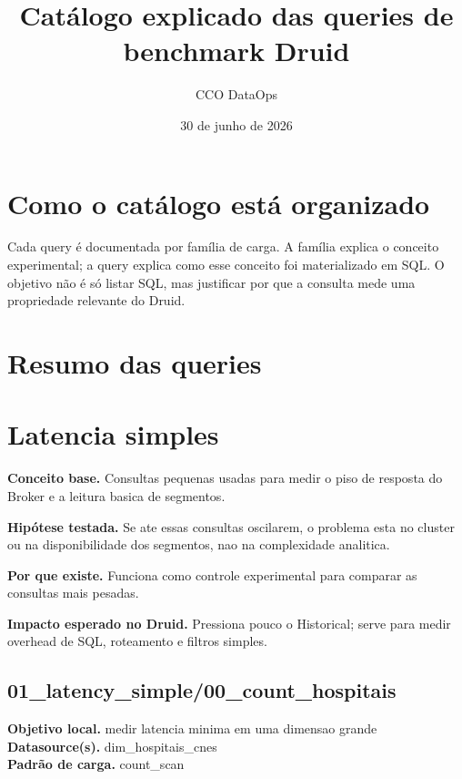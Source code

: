\documentclass[11pt,a4paper]{article}
\title{Catálogo explicado das queries de benchmark Druid}
\author{CCO DataOps}
\date{30 de junho de 2026}
\begin{document}
\maketitle


\section{Como o catálogo está organizado}

Cada query é documentada por família de carga. A família explica o conceito experimental; a query explica como esse conceito foi materializado em SQL. O objetivo não é só listar SQL, mas justificar por que a consulta mede uma propriedade relevante do Druid.

\section{Resumo das queries}



\clearpage

\section{Latencia simples}

\textbf{Conceito base.} Consultas pequenas usadas para medir o piso de resposta do Broker e a leitura basica de segmentos.

\textbf{Hipótese testada.} Se ate essas consultas oscilarem, o problema esta no cluster ou na disponibilidade dos segmentos, nao na complexidade analitica.

\textbf{Por que existe.} Funciona como controle experimental para comparar as consultas mais pesadas.

\textbf{Impacto esperado no Druid.} Pressiona pouco o Historical; serve para medir overhead de SQL, roteamento e filtros simples.

\subsection{01\_latency\_simple/00\_count\_hospitais}

\textbf{Objetivo local.} medir latencia minima em uma dimensao grande\\

\textbf{Datasource(s).} dim\_hospitais\_cnes\\

\textbf{Padrão de carga.} count\_scan\\
\end{document}
